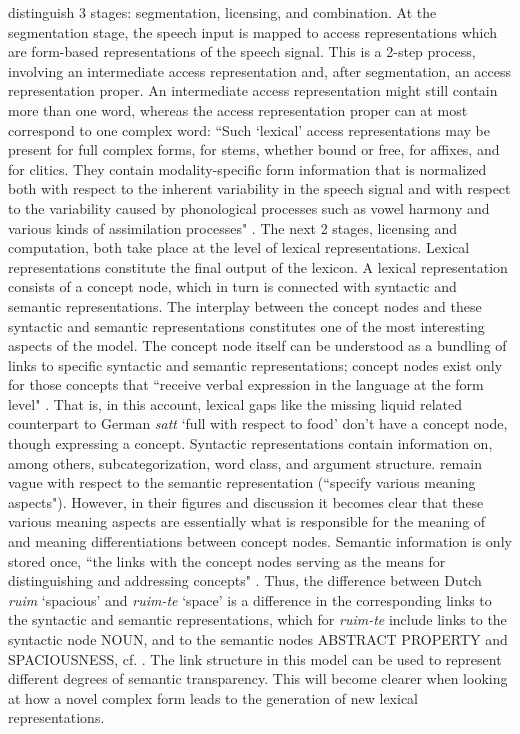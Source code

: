 \noindent
\citet{SchreuderandBaayen:1995} distinguish 3 stages:
segmentation, licensing, and combination. At the segmentation stage,
the speech input is mapped to access representations which are form-based representations of the speech signal. This is a 2-step
process, involving an intermediate access representation and, after segmentation, an access
representation proper. An
intermediate access representation might still contain more than one word,
whereas the access representation proper can at most correspond to one
complex word: ``Such `lexical' access
representations may be present for full complex forms, for stems,
whether bound or free, for affixes, and for clitics. They contain
modality-specific form information that is normalized both with
respect to the inherent variability in the speech signal and with
respect to the variability caused by phonological processes such as
vowel harmony and various kinds of assimilation
processes" \citep[133--134]{SchreuderandBaayen:1995}. 
The next 2 stages, licensing and computation, both take
place at the level of lexical representations. Lexical representations constitute the final output of the
lexicon. A lexical representation consists of a concept node,
which in turn is connected with syntactic and semantic
representations. The interplay between the concept nodes and these
syntactic and semantic representations constitutes one of the most
interesting aspects of the model. The concept node itself can be
understood as a bundling of links to specific syntactic and semantic
representations; concept nodes exist only for those concepts that
``receive verbal expression in the language at the form level"
\citep[136]{SchreuderandBaayen:1995}. That is, in this account,
lexical gaps like the missing liquid related counterpart to German \emph{satt} `full with respect to
food' don't have a concept node, though expressing a concept. Syntactic representations contain information on, among others,
subcategorization, word class, and argument structure.
\citet[136]{SchreuderandBaayen:1995} remain vague with respect to the
semantic representation (``specify various meaning aspects"). However,
in their figures and discussion it becomes clear that these various meaning aspects
are essentially what is responsible for the meaning of and meaning
differentiations between concept nodes. Semantic information is only
stored once, ``the links with the concept nodes serving as the
means for distinguishing and addressing concepts" \citep[140]{SchreuderandBaayen:1995}. 
Thus, the difference between Dutch
\emph{ruim} `spacious' and \emph{ruim-te} `space' is a difference in
the corresponding links to the syntactic and semantic representations,
which for \emph{ruim-te} include links to the syntactic node
NOUN, and to the semantic nodes ABSTRACT PROPERTY and SPACIOUSNESS,
cf. \citet[138]{SchreuderandBaayen:1995}.
 The link structure in this
model can be used to represent different degrees of semantic
transparency. This will become clearer when looking at how a novel
complex form leads to the generation of new lexical representations.

